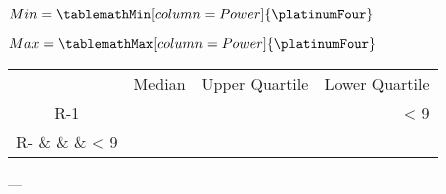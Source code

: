 \documentclass{article}
\begin{document}
    $Min = \tablemathMin[column=Power]{\platinumFour}$
    
    $Max = \tablemathMax[column=Power]{\platinumFour}$
    


\newcommand{\quantiles}[2]{%
    R-#1 &
    \tablemathQuantile[method=#1,column=Power,median]{\platinumFour} &
    \tablemathQuantile[method=#1,column=Power,upper quartile]{\platinumFour} &
    \tablemathQuantile[method=#1,column=Power,lower quartile]{\platinumFour}%
    \ifnum#1 < #2%
        \\%
        \pgfmathtruncatemacro{\cur}{int(#1+1)}%
        \expandafter\quantiles\cur{#2}%
    \fi%
}

\begin{tabular}{c|rrr}
    & Median & Upper Quartile & Lower Quartile  \\
    \quantiles{1}{9}
\end{tabular}

    ---

    \pgfplotstabletypeset{\platinumFour}
\end{document}
